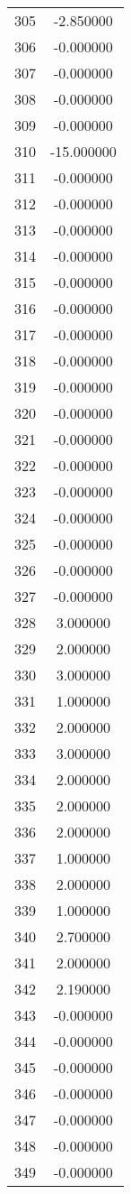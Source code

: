 \documentclass[12pt]{article}
\begin{document}
\begin{longtable}{@{}cc@{}}
305 & -2.850000 \\
306 & -0.000000 \\
307 & -0.000000 \\
308 & -0.000000 \\
309 & -0.000000 \\
310 & -15.000000 \\
311 & -0.000000 \\
312 & -0.000000 \\
313 & -0.000000 \\
314 & -0.000000 \\
315 & -0.000000 \\
316 & -0.000000 \\
317 & -0.000000 \\
318 & -0.000000 \\
319 & -0.000000 \\
320 & -0.000000 \\
321 & -0.000000 \\
322 & -0.000000 \\
323 & -0.000000 \\
324 & -0.000000 \\
325 & -0.000000 \\
326 & -0.000000 \\
327 & -0.000000 \\
328 & 3.000000 \\
329 & 2.000000 \\
330 & 3.000000 \\
331 & 1.000000 \\
332 & 2.000000 \\
333 & 3.000000 \\
334 & 2.000000 \\
335 & 2.000000 \\
336 & 2.000000 \\
337 & 1.000000 \\
338 & 2.000000 \\
339 & 1.000000 \\
340 & 2.700000 \\
341 & 2.000000 \\
342 & 2.190000 \\
343 & -0.000000 \\
344 & -0.000000 \\
345 & -0.000000 \\
346 & -0.000000 \\
347 & -0.000000 \\
348 & -0.000000 \\
349 & -0.000000 \\

\end{longtable}
\end{document}
